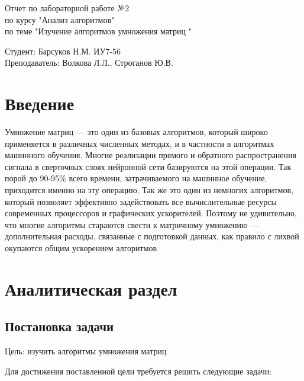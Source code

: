 \documentclass[a4paper, 14pt]{article}
\begin{document}
	\begin{titlepage}
		\begin{center}
			\begin{LARGE}
				Отчет по лабораторной работе №2\\
				по курсу "Анализ алгоритмов"\\
				по теме "Изучение алгоритмов умножения матриц "
			\end{LARGE}
			
			\begin{Large}
				\vspace{10cm}
				Студент: Барсуков Н.М. ИУ7-56\\
				Преподаватель: Волкова Л.Л.,
				Строганов Ю.В.
			\end{Large}
		\end{center}
	\end{titlepage}
	
	\tableofcontents
	
	\newpage
	\section*{Введение}
	
	Умножение матриц — это один из базовых алгоритмов, который широко применяется в различных численных методах, и в частности в алгоритмах машинного обучения. Многие реализации прямого и обратного распространения сигнала в сверточных слоях нейронной сети базируются на этой операции. Так порой до 90-95\% всего времени, затрачиваемого на машинное обучение, приходится именно на эту операцию. Так же это один из немногих алгоритмов, который позволяет эффективно задействовать все вычислительные ресурсы современных процессоров и графических ускорителей. Поэтому не удивительно, что многие алгоритмы стараются свести к матричному умножению — дополнительная расходы, связанные с подготовкой данных, как правило с лихвой окупаются общим ускорением алгоритмов

	\newpage
	\section{Аналитическая раздел}
	
	\newpage
	\subsection{Постановка задачи}
	
	Цель: изучить алгоритмы умножения матриц
	
	Для достижения поставленной цели требуется решить следующие задачи:
	
\end{document}
